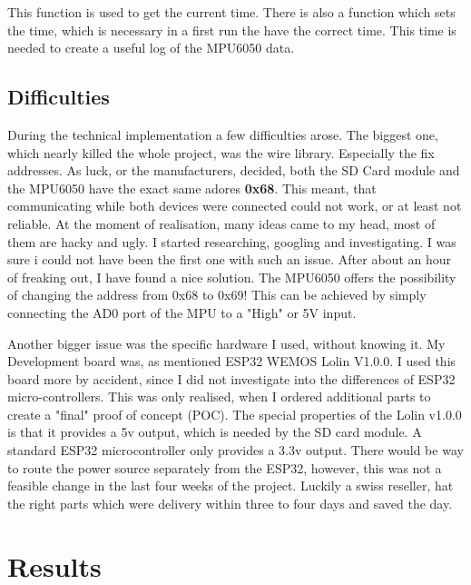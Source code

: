 This function is used to get the current time. There is also a function which sets the time, which is necessary in a first run the have the correct time. This time is needed to create a useful log of the MPU6050 data.

\subsection{Difficulties}

During the technical implementation a few difficulties arose. The biggest one, which nearly killed the whole project, was the wire library. Especially the fix addresses. As luck, or the manufacturers, decided, both the SD Card module and the MPU6050 have the exact same adores \textbf{0x68}. This meant, that communicating while both devices were connected could not work, or at least not reliable. At the moment of realisation, many ideas came to my head, most of them are hacky and ugly. I started researching, googling and investigating. I was sure i could not have been the first one with such an issue. After about an hour of freaking out, I have found a nice solution. 
The MPU6050 offers the possibility of changing the address from 0x68 to 0x69! This can be achieved by simply connecting the AD0 port of the MPU to a "High" or 5V input.

Another bigger issue was the specific hardware I used, without knowing it. My Development board was, as mentioned ESP32 WEMOS Lolin V1.0.0. I used this board more by accident, since I did not investigate into the differences of ESP32 micro-controllers. This was only realised, when I ordered additional parts to create a "final" proof of concept (POC). The special properties of the Lolin v1.0.0 is that it provides a 5v output, which is needed by the SD card module. A standard ESP32 microcontroller only provides a 3.3v output. There would be way to route the power source separately from the ESP32, however, this was not a feasible change in the last four weeks of the project. Luckily a swiss reseller, hat the right parts which were delivery within three to four days and saved the day.
\newpage
\section{Results}


